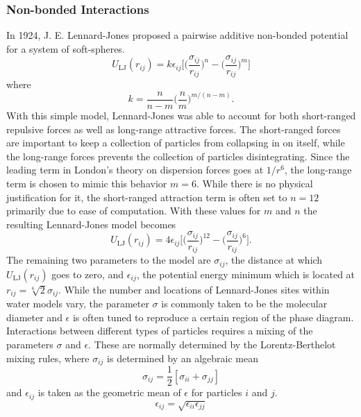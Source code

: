 \subsubsection{Non-bonded Interactions}
In 1924, J. E. Lennard-Jones proposed a pairwise additive
non-bonded potential for a system of soft-spheres.
\begin{equation}\label{eq:LJ}
U_{\mathrm{LJ}}(r_{ij}) = k\epsilon_{ij}\Bigg[ \Big( \frac{\sigma_{ij}}{r_{ij}}\Big)^n - \Big(\frac{\sigma_{ij}}{r_{ij}}\Big)^m\Bigg]
\end{equation}
where
\begin{equation}\label{eq:LJ2}
k = \frac{n}{n-m} \Big(\frac{n}{m}\Big)^{m/(n-m)}.
\end{equation}
With this simple model, Lennard-Jones was able to account for both
short-ranged repulsive forces as well as long-range attractive
forces. The short-ranged forces are important to keep a collection of
particles from collapsing in on itself, while the long-range forces
prevents the collection of particles disintegrating. Since the leading
term in London's theory on dispersion forces goes at $1/r^6$, the
long-range term is chosen to mimic this behavior $m=6$. While there is
no physical justification for it, the short-ranged attraction term is
often set to $n=12$ primarily due to ease of computation. With these
values for $m$ and $n$ the resulting Lennard-Jones model becomes
\begin{equation}\label{eq:LJ3}
U_{\mathrm{LJ}}(r_{ij}) =
4\epsilon_{ij}\Bigg[\Big(\frac{\sigma_{ij}}{r_{ij}}\Big)^{12}-\Big(\frac{\sigma_{ij}}{r_{ij}}\Big)^{6}\Bigg].
\end{equation} 
The remaining two parameters to the model are $\sigma_{ij}$, the distance
at which $U_{\mathrm{LJ}}(r_{ij})$ goes to zero, and $\epsilon_{ij}$, the potential
energy minimum which is located at $r_{ij} = \sqrt[6]{2}\sigma_{ij}$. While the
number and locations of Lennard-Jones sites within water models vary,
the parameter $\sigma$ is commonly taken to be the molecular diameter
and $\epsilon$ is often tuned to reproduce a certain region of the
phase diagram. Interactions between different types of particles
requires a mixing of the parameters $\sigma$ and $\epsilon$. These are
normally determined by the Lorentz-Berthelot mixing rules, where
$\sigma_{ij}$ is determined by an algebraic mean 
\begin{equation}\label{eq:sigma}
\sigma_{ij} = \frac{1}{2} [\sigma_{ii} + \sigma_{jj}]
\end{equation}
and $\epsilon_{ij}$ is taken as the geometric mean of $\epsilon$ for
particles $i$ and $j$. \cite{paper}
\begin{equation}\label{eq:epsilon}
\epsilon_{ij} = \sqrt{\epsilon_{ii}\epsilon_{jj}}
\end{equation}


